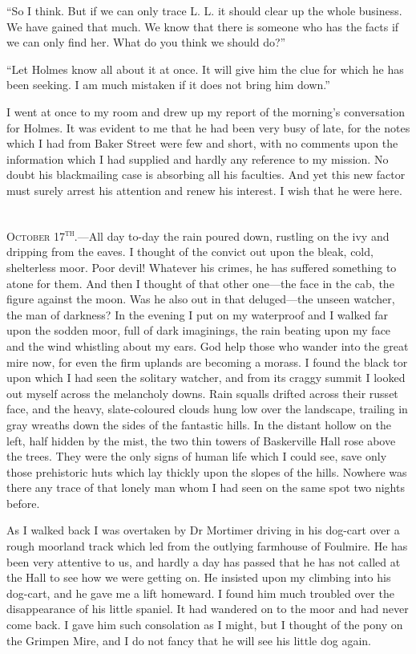 \documentclass[paper=5.5in:8.5in,BCOR=7mm,twoside,DIV=calc,12pt,usegeometry,openany,chapterprefix,endperiod,headings=big]{scrbook} %
\begin{document}
\enquote{So I think. But if we can only trace L. L. it should clear up the whole business. We have gained that much. We know that there is someone who has the facts if we can only find her. What do you think we should do?}

\enquote{Let Holmes know all about it at once. It will give him the clue for which he has been seeking. I am much mistaken if it does not bring him down.}

I went at once to my room and drew up my report of the morning's conversation for Holmes. It was evident to me that he had been very busy of late, for the notes which I had from Baker Street were few and short, with no comments upon the information which I had supplied and hardly any reference to my mission. No doubt his blackmailing case is absorbing all his faculties. And yet this new factor must surely arrest his attention and renew his interest. I wish that he were here.

~\\

\textsc{October 17\textsuperscript{th}.}---All day to-day the rain poured down, rustling on the ivy and dripping from the eaves. I thought of the convict out upon the bleak, cold, shelterless moor. Poor devil! Whatever his crimes, he has suffered something to atone for them. And then I thought of that other one---the face in the cab, the figure against the moon. Was he also out in that deluged---the unseen watcher, the man of darkness? In the evening I put on my waterproof and I walked far upon the sodden moor, full of dark imaginings, the rain beating upon my face and the wind whistling about my ears. God help those who wander into the great mire now, for even the firm uplands are becoming a morass. I found the black tor upon which I had seen the solitary watcher, and from its craggy summit I looked out myself across the melancholy downs. Rain squalls drifted across their russet face, and the heavy, slate-coloured clouds hung low over the landscape, trailing in gray wreaths down the sides of the fantastic hills. In the distant hollow on the left, half hidden by the mist, the two thin towers of Baskerville Hall rose above the trees. They were the only signs of human life which I could see, save only those prehistoric huts which lay thickly upon the slopes of the hills. Nowhere was there any trace of that lonely man whom I had seen on the same spot two nights before.

As I walked back I was overtaken by Dr Mortimer driving in his dog-cart over a rough moorland track which led from the outlying farmhouse of Foulmire. He has been very attentive to us, and hardly a day has passed that he has not called at the Hall to see how we were getting on. He insisted upon my climbing into his dog-cart, and he gave me a lift homeward. I found him much troubled over the disappearance of his little spaniel. It had wandered on to the moor and had never come back. I gave him such consolation as I might, but I thought of the pony on the Grimpen Mire, and I do not fancy that he will see his little dog again.
\end{document}
